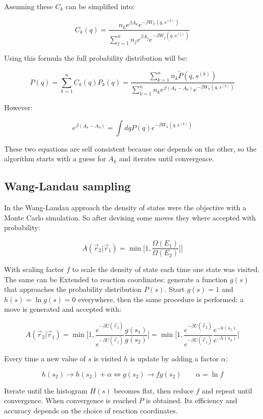 	Assuming these $C_k$ can be simplified into:

	$$C_k(q) = \frac{n_ke^{\beta A_k}e^{-\beta W_k(q, s^{(k)})}}{\sum\limits_{j=1}^nn_je^{\beta A_j}e^{-\beta W_j(q, s^{(j)})}}$$

	Using this formula the full probability distribution will be:

	$$P(q) = \sum\limits_{k=1}^nC_k(q)P_k(q) = \frac{\sum\limits_{k=1}^nn_k\tilde{P}(q, s^{(k)})}{\sum\limits_{k=1}^nn_ke^{\beta(A_k-A_0)}e^{-\beta W_k(q, s^{(k)})}}$$

	However:

	$$e^{\beta(A_k-A_0)} = \int dq P(q)e^{-\beta W_k(q, s^{(k)})}$$

	These two equations are self consistent because one depends on the other, so the algorithm starts with a guess for $A_k$ and iterates until convergence.

	\subsection{Wang-Landau sampling}
	In the Wang-Landau approach the density of states were the objective with a Monte Carlo simulation.
	So after devising some moves they where accepted with probability:

	$$A(\vec{r}_2|\vec{r}_1) = \min\biggl[1, \frac{\Omega(E_1)}{\Omega(E_2)}]\biggr]$$

	With scaling factor $f$ to scale the density of state each time one state was visited.
	The same can be Extended to reaction coordinates: generate a function $g(s)$ that approaches the probability distribution $P(s)$.
	Start $g(s)=1$ and $h(s) = \ln g(s) = 0$ everywhere, then the same procedure is performed: a move is generated and accepted with:

	$$A(\vec{r}_2|\vec{r}_1) = \min\biggl[1, \frac{e^{-\beta U(\vec{r}_2)}}{e^{-\beta U(\vec{r}_1)}}\frac{g(s_1)}{g(s_2)}\biggr] = \min\biggl[1, \frac{e^{-\beta U(\vec{r}_2)}}{e^{-\beta U(\vec{r}_1)}}\frac{e^{-h(s_1)}}{e^{-h(s_2)}}\biggr]$$

	Every time a new value of $s$ is visited $h$ is update by adding a factor $\alpha$:

	$$h(s_2) \rightarrow h(s_2) + \alpha \Leftrightarrow g(s_2)\rightarrow fg(s_2)\qquad \alpha = \ln f$$

	Iterate until the histogram $H(s)$ becomes flat, then reduce $f$ and repeat until convergence.
	When convergence is reached $P$ is obtained.
	Its efficiency and accuracy depends on the choice of reaction coordinates.
